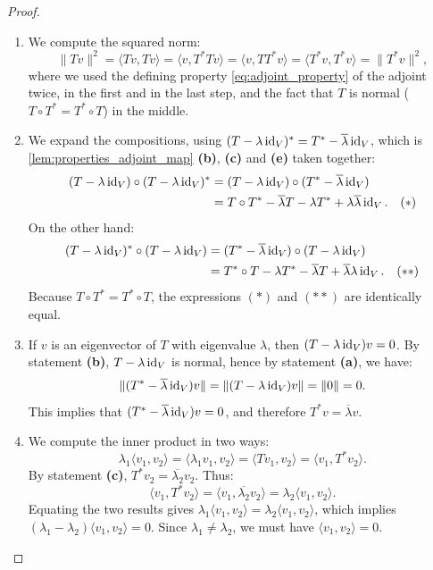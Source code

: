 \begin{proof}
\begin{enumerate}[label=\textbf{(\alph*)}]
    \item We compute the squared norm:
    \[
        \|Tv\|^2 = \langle Tv, Tv \rangle = \langle v, T^*Tv \rangle = \langle v, TT^*v \rangle = \langle T^*v, T^*v \rangle = \|T^*v\|^2,
    \]
    where we used the defining property \eqref{eq:adjoint_property} of the adjoint twice, in the first and in the last step, and the fact that $T$ is normal ($T \circ T^* = T^* \circ T$) in the middle.
    
    \item We expand the compositions, using $(T - \lambda \operatorname{id}_V)^* = T^* - \overline{\lambda} \operatorname{id}_V$, which is \cref{lem:properties_adjoint_map} \textbf{(b)}, \textbf{(c)} and \textbf{(e)} taken together:
    \begin{align*}
        (T - \lambda \operatorname{id}_V) \circ (T - \lambda \operatorname{id}_V)^* &= (T - \lambda \operatorname{id}_V) \circ (T^* - \overline{\lambda} \operatorname{id}_V) \\
        &= T \circ T^* - \overline{\lambda} T - \lambda T^* + \lambda \overline{\lambda} \operatorname{id}_V. \quad (*)
    \end{align*}
    On the other hand:
    \begin{align*}
        (T - \lambda \operatorname{id}_V)^* \circ (T - \lambda \operatorname{id}_V) &= (T^* - \overline{\lambda} \operatorname{id}_V) \circ (T - \lambda \operatorname{id}_V) \\
        &= T^* \circ T - \lambda T^* - \overline{\lambda} T + \overline{\lambda} \lambda \operatorname{id}_V. \quad (**)
    \end{align*}
    Because $T \circ T^* = T^* \circ T$, the expressions $(*)$ and $(**)$ are identically equal.
    
    \item If $v$ is an eigenvector of $T$ with eigenvalue $\lambda$, then $(T - \lambda \operatorname{id}_V)v = 0$. By statement \textbf{(b)}, $T - \lambda \operatorname{id}_V$ is normal, hence by statement \textbf{(a)}, we have:
    \[
        \|(T^* - \overline{\lambda} \operatorname{id}_V)v\| = \|(T - \lambda \operatorname{id}_V)v\| = \|0\| = 0.
    \]
    This implies that $(T^* - \overline{\lambda} \operatorname{id}_V)v = 0$, and therefore $T^*v = \overline{\lambda}v$.
    
    \item We compute the inner product in two ways:
    \[
        \lambda_1 \langle v_1, v_2 \rangle = \langle \lambda_1 v_1, v_2 \rangle = \langle Tv_1, v_2 \rangle = \langle v_1, T^*v_2 \rangle.
    \]
    By statement \textbf{(c)}, $T^*v_2 = \overline{\lambda_2}v_2$. Thus:
    \[
        \langle v_1, T^*v_2 \rangle = \langle v_1, \overline{\lambda_2} v_2 \rangle = \lambda_2 \langle v_1, v_2 \rangle.
    \]
    Equating the two results gives $\lambda_1 \langle v_1, v_2 \rangle = \lambda_2 \langle v_1, v_2 \rangle$, which implies $(\lambda_1 - \lambda_2) \langle v_1, v_2 \rangle = 0$. 
    Since $\lambda_1 \neq \lambda_2$, we must have $\langle v_1, v_2 \rangle = 0$.
\end{enumerate}
\end{proof}

